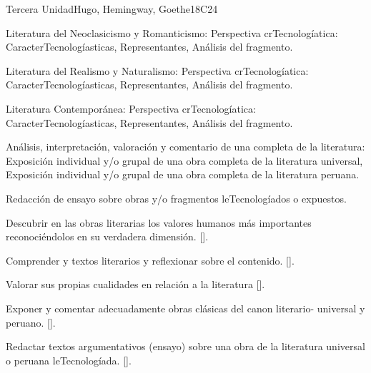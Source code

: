 \begin{syllabus}
\begin{unit}{}{Tercera Unidad}{Hugo, Hemingway, Goethe}{18}{C24}
\begin{topics}
	\item Literatura del Neoclasicismo y Romanticismo: Perspectiva crTecnologíatica: CaracterTecnologíasticas, Representantes, Análisis del fragmento.
	\item Literatura del Realismo y Naturalismo: Perspectiva crTecnologíatica: CaracterTecnologíasticas, Representantes, Análisis del fragmento.
	\item Literatura Contemporánea: Perspectiva crTecnologíatica: CaracterTecnologíasticas, Representantes, Análisis del fragmento.
	\item Análisis, interpretación, valoración y comentario de una completa de la literatura: Exposición individual y/o grupal de una obra completa de la literatura universal, Exposición individual y/o grupal de una obra  completa de la literatura peruana.
	\item Redacción de ensayo sobre obras y/o fragmentos leTecnologíados o expuestos.
\end{topics}
\begin{learningoutcomes}
	\item Descubrir en las obras literarias los valores humanos más importantes reconociéndolos en su verdadera dimensión. [\Usage].
	\item Comprender y textos literarios y reflexionar sobre el contenido. [\Usage].
	\item Valorar sus propias cualidades en relación a la literatura [\Usage].
	\item Exponer y comentar adecuadamente  obras clásicas del canon literario- universal y peruano. [\Usage].
	\item Redactar textos argumentativos (ensayo) sobre una obra de la literatura universal o peruana leTecnologíada. [\Usage].
\end{learningoutcomes}
\end{unit}



\begin{coursebibliography}
\end{coursebibliography}
\end{syllabus}
